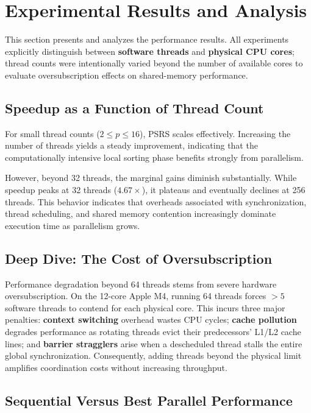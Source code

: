 \documentclass[11pt]{article}
\begin{document}
\section{Experimental Results and Analysis}

This section presents and analyzes the performance results. All experiments explicitly distinguish between \textbf{software threads} and \textbf{physical CPU cores}; thread counts were intentionally varied beyond the number of available cores to evaluate oversubscription effects on shared-memory performance.

\subsection{Speedup as a Function of Thread Count}

For small thread counts ($2 \le p \le 16$), PSRS scales effectively. Increasing the number of threads yields a steady improvement, indicating that the computationally intensive local sorting phase benefits strongly from parallelism.

However, beyond 32 threads, the marginal gains diminish substantially. While speedup peaks at 32 threads ($4.67\times$), it plateaus and eventually declines at 256 threads. This behavior indicates that overheads associated with synchronization, thread scheduling, and shared memory contention increasingly dominate execution time as parallelism grows.

\subsection{Deep Dive: The Cost of Oversubscription}

Performance degradation beyond 64 threads stems from severe hardware oversubscription. On the 12-core Apple M4, running 64 threads forces $>5$ software threads to contend for each physical core. This incurs three major penalties: \textbf{context switching} overhead wastes CPU cycles; \textbf{cache pollution} degrades performance as rotating threads evict their predecessors' L1/L2 cache lines; and \textbf{barrier stragglers} arise when a descheduled thread stalls the entire global synchronization. Consequently, adding threads beyond the physical limit amplifies coordination costs without increasing throughput.

\subsection{Sequential Versus Best Parallel Performance}
\end{document}
